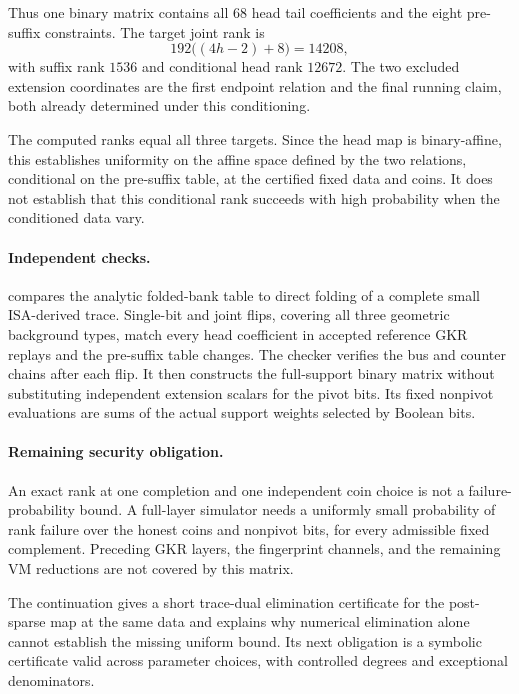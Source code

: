 \documentclass[11pt]{article}
\begin{document}
Thus one binary matrix contains all $68$ head tail coefficients and the eight pre-suffix constraints. The target joint rank is
\[
 192\bigl((4h-2)+8\bigr)=14208,
\]
with suffix rank $1536$ and conditional head rank $12672$. The two excluded extension coordinates are the first endpoint relation and the final running claim, both already determined under this conditioning.

The computed ranks equal all three targets. Since the head map is binary-affine, this establishes uniformity on the affine space defined by the two relations, conditional on the pre-suffix table, at the certified fixed data and coins. It does not establish that this conditional rank succeeds with high probability when the conditioned data vary.

\paragraph{Independent checks.}  compares the analytic folded-bank table to direct folding of a complete small ISA-derived trace. Single-bit and joint flips, covering all three geometric background types, match every head coefficient in accepted reference GKR replays and the pre-suffix table changes. The checker verifies the bus and counter chains after each flip. It then constructs the full-support binary matrix without substituting independent extension scalars for the pivot bits. Its fixed nonpivot evaluations are sums of the actual support weights selected by Boolean bits.

\paragraph{Remaining security obligation.} An exact rank at one completion and one independent coin choice is not a failure-probability bound. A full-layer simulator needs a uniformly small probability of rank failure over the honest coins and nonpivot bits, for every admissible fixed complement. Preceding GKR layers, the fingerprint channels, and the remaining VM reductions are not covered by this matrix.

The continuation  gives a short trace-dual elimination certificate for the post-sparse map at the same data and explains why numerical elimination alone cannot establish the missing uniform bound. Its next obligation is a symbolic certificate valid across parameter choices, with controlled degrees and exceptional denominators.
\end{document}
